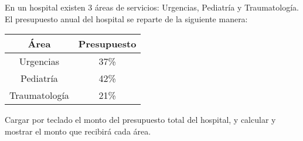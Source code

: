En un hospital existen 3 áreas de servicios: Urgencias, Pediatría y Traumatología. El presupuesto anual del hospital se reparte de la siguiente manera: 
\bigskip
\begin{center}
	
\begin{tabular}{| c | c |}
\hline
Área & Presupuesto\\
\hline
Urgencias & 37\%\\
Pediatría & 42\%\\
Traumatología & 21\% \\
\hline
\end{tabular}
\end{center}
\bigskip

Cargar por teclado el monto del presupuesto total del hospital, y calcular y mostrar el monto que recibirá cada área.